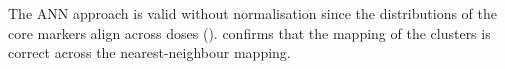 
The \gls{ANN} approach is valid without normalisation since the distributions of the core markers align across doses ().
 confirms that the mapping of the clusters is correct across the nearest-neighbour mapping.






